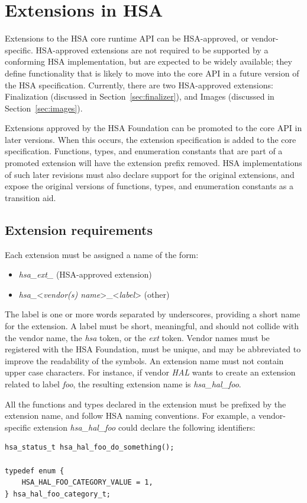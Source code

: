 \documentclass[final,oneside]{book}
\begin{document}
\section{Extensions in HSA}
Extensions to the HSA core runtime API can be HSA-approved, or vendor-specific.
HSA-approved extensions are not required to be supported by a conforming HSA
implementation, but are expected to be widely available; they define
functionality that is likely to move into the core API in a future version of
the HSA specification. Currently, there are two HSA-approved extensions:
Finalization (discussed in Section~\ref{sec:finalizer}), and Images
(discussed in Section~\ref{sec:images}).

Extensions approved by the HSA Foundation can be promoted to the core API in
later versions. When this occurs, the extension specification is added to the
core specification. Functions, types, and enumeration constants that are part of
a promoted extension will have the extension prefix removed. HSA implementations
of such later revisions must also declare support for the original extensions,
and expose the original versions of functions, types, and enumeration constants
as a transition aid.

\subsection{Extension requirements}

Each extension must be assigned a name of the form:
\begin{itemize}[itemsep=1pt,topsep=3pt,partopsep=0pt]
\item \textit{hsa_ext_} (HSA-approved extension)
\item \textit{hsa_}<\textit{vendor(s) name}>_<\textit{label}> (other)
\end{itemize}
The label is one or more words separated by underscores, providing a short name
for the extension. A label must be short, meaningful, and should not collide
with the vendor name, the \textit{hsa} token, or the \textit{ext} token. Vendor
names must be registered with the HSA Foundation, must be unique, and may be
abbreviated to improve the readability of the symbols. An extension name must
not contain upper case characters. For instance, if vendor \textit{HAL} wants to
create an extension related to label \textit{foo}, the resulting extension name
is \textit{hsa_hal_foo}.

All the functions and types declared in the extension must be prefixed by the
extension name, and follow HSA naming conventions. For example, a
vendor-specific extension \textit{hsa_hal_foo} could declare the following
identifiers:
\begin{lstlisting}
hsa_status_t hsa_hal_foo_do_something();

typedef enum {
    HSA_HAL_FOO_CATEGORY_VALUE = 1,
} hsa_hal_foo_category_t;
\end{lstlisting}
\end{document}
